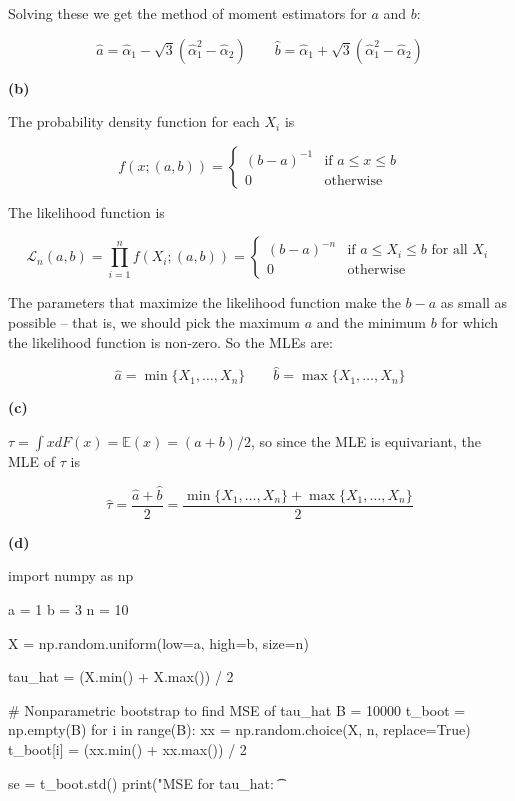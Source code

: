 Solving these we get the method of moment estimators for \(a\) and
\(b\):

\[
\hat{a} = \hat{\alpha}_{1} - \sqrt{3}(\hat{\alpha}_{1}^{2} - \hat{\alpha}_{2})
\quad \quad
\hat{b} = \hat{\alpha}_{1} + \sqrt{3}(\hat{\alpha}_{1}^{2} - \hat{\alpha}_{2})
\]

\textbf{(b)}

The probability density function for each \(X_{i}\) is

\[f(x; (a, b)) = \begin{cases}
(b - a)^{-1} & \text{if } a \leq x \leq b \\
0 & \text{otherwise}
\end{cases}\]

The likelihood function is

\[\mathcal{L}_{n}(a, b) = \prod_{i=1}^{n} f(X_{i}; (a, b)) = \begin{cases}
(b-a)^{-n} & \text{if } a \leq X_{i} \leq b \text{ for all } X_{i}\\
0 & \text{otherwise}
\end{cases}
\]

The parameters that maximize the likelihood function make the \(b - a\)
as small as possible -- that is, we should pick the maximum \(a\) and
the minimum \(b\) for which the likelihood function is non-zero. So the
MLEs are:

\[\hat{a} = \min \{X_{1}, \dots, X_{n} \}
\quad \quad
\hat{b} = \max \{X_{1}, \dots, X_{n} \}\]

\textbf{(c)}

\(\tau = \int x dF(x) = \mathbb{E}(x) = (a + b)/2\), so since the MLE is
equivariant, the MLE of \(\tau\) is

\[\hat{\tau} = \frac{\hat{a} + \hat{b}}{2} = \frac{\min \{X_{1}, \dots, X_{n}\} + \max\{X_{1}, \dots, X_{n}\}}{2}\]

\textbf{(d)}

\begin{python}
import numpy as np

a = 1
b = 3
n = 10

X = np.random.uniform(low=a, high=b, size=n)
\end{python}

\begin{python}
tau_hat = (X.min() + X.max()) / 2

# Nonparametric bootstrap to find MSE of tau_hat
B = 10000
t_boot = np.empty(B)
for i in range(B):
    xx = np.random.choice(X, n, replace=True)
    t_boot[i] = (xx.min() + xx.max()) / 2
    
se = t_boot.std()
print("MSE for tau_hat: \t %
\end{python}


